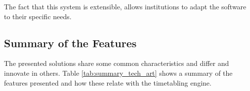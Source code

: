 The fact that this system is extensible, allows institutions to adapt the software to their specific needs.
\subsection{Summary of the Features}

The presented solutions share some common characteristics and differ and innovate in others.
Table \ref{tab:summary_tech_art} shows a summary of the features presented and how these relate with the timetabling engine.

\begin{table}[H]
\centering
{}
\caption[Summary of the software features]{Summary of the software features}
\label{tab:summary_tech_art}
\end{table}


